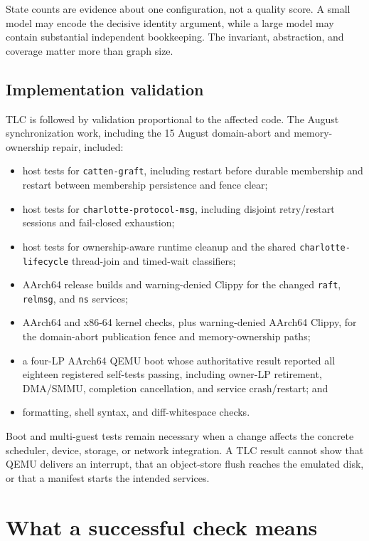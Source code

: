 State counts are evidence about one configuration, not a quality score. A
small model may encode the decisive identity argument, while a large model may
contain substantial independent bookkeeping. The invariant, abstraction, and
coverage matter more than graph size.

\subsection{Implementation validation}

TLC is followed by validation proportional to the affected code. The August
synchronization work, including the 15 August domain-abort and memory-ownership
repair, included:

\begin{itemize}
    \item host tests for \texttt{catten-graft}, including restart before durable
        membership and restart between membership persistence and fence clear;
    \item host tests for \texttt{charlotte-protocol-msg}, including disjoint
        retry/restart sessions and fail-closed exhaustion;
    \item host tests for ownership-aware runtime cleanup and the shared
        \texttt{charlotte-lifecycle} thread-join and timed-wait classifiers;
    \item AArch64 release builds and warning-denied Clippy for the changed
        \texttt{raft}, \texttt{relmsg}, and \texttt{ns} services;
    \item AArch64 and x86-64 kernel checks, plus warning-denied AArch64 Clippy,
        for the domain-abort publication fence and memory-ownership paths;
    \item a four-LP AArch64 QEMU boot whose authoritative result reported all
        eighteen registered self-tests passing, including owner-LP retirement,
        DMA/SMMU, completion cancellation, and service crash/restart; and
    \item formatting, shell syntax, and diff-whitespace checks.
\end{itemize}

Boot and multi-guest tests remain necessary when a change affects the concrete
scheduler, device, storage, or network integration. A TLC result cannot show
that QEMU delivers an interrupt, that an object-store flush reaches the
emulated disk, or that a manifest starts the intended services.

\section{What a successful check means}

